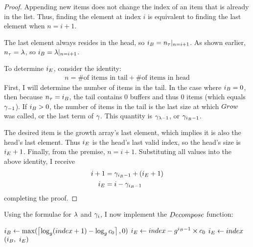 \begin{proof}
	Appending new items does not change the index of an item that is already in the list. Thus, finding the element at index $i$ is equivalent to finding the last element when $n = i + 1$.
	
	The last element always resides in the head, so $i_B = n_\tau|_{n = i + 1}$. As shown earlier, $n_\tau = \lambda$, so $i_B = \lambda|_{n = i + 1}$.
	
	To determine $i_E$, consider the identity:
	\begin{align*}
	n = \text{\# of items in tail} + \text{\# of items in head}
	\end{align*}
	First, I will determine the number of items in the tail. In the case where $i_B = 0$, then because $n_\tau = i_B$, the tail contains $0$ buffers and thus $0$ items (which equals $\gamma_{-1}$). If $i_B > 0$, the number of items in the tail is the last size at which $Grow$ was called, or the last term of $\gamma$. This quantity is $\gamma_{\lambda - 1}$, or $\gamma_{i_B - 1}$.
	
	The desired item is the growth array's last element, which implies it is also the head's last element. Thus $i_E$ is the head's last valid index, so the head's size is $i_E + 1$. Finally, from the premise, $n = i + 1$. Substituting all values into the above identity, I receive
	\begin{align*}
	i + 1 &= \gamma_{i_B - 1} + (i_E + 1)\\
	i_E &= i - \gamma_{i_B - 1}
	\end{align*}
	completing the proof.
\end{proof}

Using the formulae for $\lambda$ and $\gamma_i$, I now implement the $\FuncDecompose$ function:

\begin{algorithm}[H]
	\begin{algorithmic}
		\Function{$\FuncDecompose$}{$\ParamIndex$}
			\State $i_B \gets \max(\left\lceil \log_{g} (index + 1) - \log_{g} c_0 \right\rceil, 0)$
				\State $i_E \gets index - g^{i_B - 1} \times c_0$
			\Else
				\State $i_E \gets index$
			\EndIf
			\State \Return $(\LclIndexBuffer,\ \LclIndexElement)$
		\EndFunction
	\end{algorithmic}
\end{algorithm}

